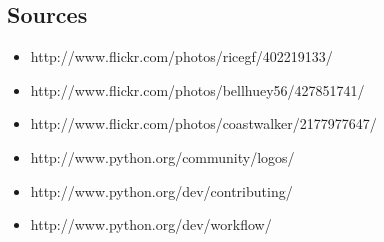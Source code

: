 \documentclass[handout]{beamer}
\begin{document}
\subsection{Sources}
\frame
{
    \begin{itemize}
    \item http://www.flickr.com/photos/ricegf/402219133/
    \item http://www.flickr.com/photos/bellhuey56/427851741/
    \item http://www.flickr.com/photos/coastwalker/2177977647/
    \item http://www.python.org/community/logos/
    \item http://www.python.org/dev/contributing/
    \item http://www.python.org/dev/workflow/
    \end{itemize}
}
\end{document}
